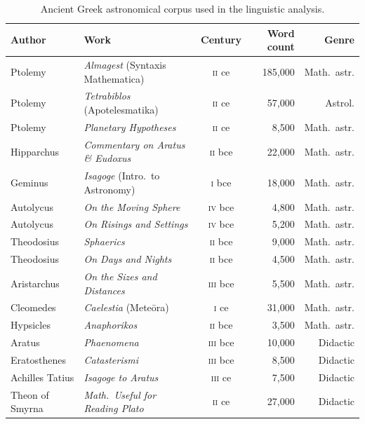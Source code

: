 \documentclass[11pt,a4paper]{article}
\begin{document}
\begin{table}[h]
\caption{Ancient Greek astronomical corpus used in the linguistic
  analysis.}\label{tab:corpus}
\centering
\small
\begin{tabular}{@{}lp{5cm}crr@{}}
\toprule
Author & Work & Century & Word count & Genre \\
\midrule
Ptolemy          & \textit{Almagest} (Syntaxis Mathematica)    & \textsc{ii} ce  & 185,000 & Math.~astr. \\
Ptolemy          & \textit{Tetrabiblos} (Apotelesmatika)       & \textsc{ii} ce  &  57,000 & Astrol. \\
Ptolemy          & \textit{Planetary Hypotheses}               & \textsc{ii} ce  &   8,500 & Math.~astr. \\
Hipparchus       & \textit{Commentary on Aratus \& Eudoxus}   & \textsc{ii} bce &  22,000 & Math.~astr. \\
Geminus          & \textit{Isagoge} (Intro.\ to Astronomy)    & \textsc{i} bce  &  18,000 & Math.~astr. \\
Autolycus        & \textit{On the Moving Sphere}               & \textsc{iv} bce &   4,800 & Math.~astr. \\
Autolycus        & \textit{On Risings and Settings}            & \textsc{iv} bce &   5,200 & Math.~astr. \\
Theodosius       & \textit{Sphaerics}                          & \textsc{ii} bce &   9,000 & Math.~astr. \\
Theodosius       & \textit{On Days and Nights}                 & \textsc{ii} bce &   4,500 & Math.~astr. \\
Aristarchus      & \textit{On the Sizes and Distances}         & \textsc{iii} bce&   5,500 & Math.~astr. \\
Cleomedes        & \textit{Caelestia} (Mete\={o}ra)           & \textsc{i} ce   &  31,000 & Math.~astr. \\
Hypsicles        & \textit{Anaphorikos}                        & \textsc{ii} bce &   3,500 & Math.~astr. \\
Aratus           & \textit{Phaenomena}                         & \textsc{iii} bce&  10,000 & Didactic \\
Eratosthenes     & \textit{Catasterismi}                       & \textsc{iii} bce&   8,500 & Didactic \\
Achilles Tatius  & \textit{Isagoge to Aratus}                  & \textsc{iii} ce &   7,500 & Didactic \\
Theon of Smyrna  & \textit{Math.\ Useful for Reading Plato}   & \textsc{ii} ce  &  27,000 & Didactic \\

\end{tabular}
\end{table}
\end{document}
